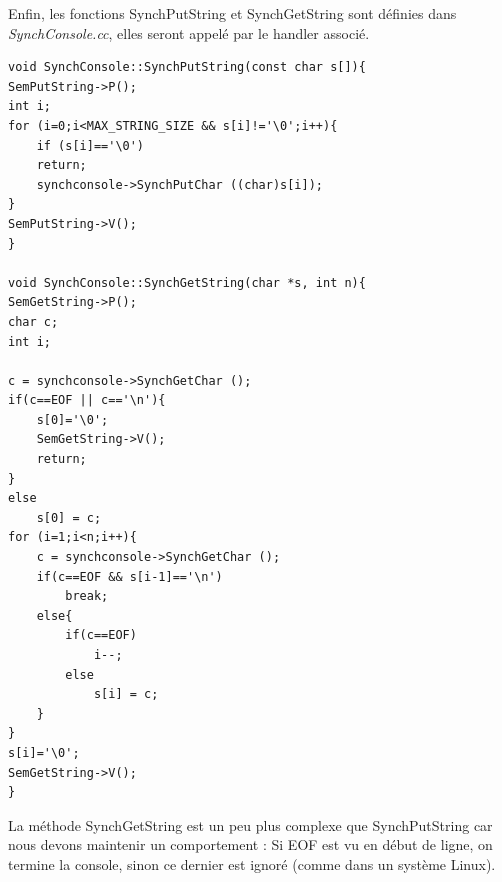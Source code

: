 \documentclass[a4paper,10pt]{article}
\begin{document}
Enfin, les fonctions SynchPutString et SynchGetString sont définies dans \textit{SynchConsole.cc}, elles seront appelé
par le handler associé.

\begin{lstlisting}[frame=single]
void SynchConsole::SynchPutString(const char s[]){
SemPutString->P();
int i;
for (i=0;i<MAX_STRING_SIZE && s[i]!='\0';i++){
	if (s[i]=='\0')
	return;
	synchconsole->SynchPutChar ((char)s[i]);
}
SemPutString->V();
}

void SynchConsole::SynchGetString(char *s, int n){
SemGetString->P();
char c;
int i;

c = synchconsole->SynchGetChar ();
if(c==EOF || c=='\n'){
	s[0]='\0';
	SemGetString->V();
	return;
}
else
	s[0] = c;
for (i=1;i<n;i++){
	c = synchconsole->SynchGetChar ();
	if(c==EOF && s[i-1]=='\n')
		break;
	else{
		if(c==EOF)
			i--;
		else
			s[i] = c;
	}
}
s[i]='\0';
SemGetString->V();
}
\end{lstlisting}
La méthode SynchGetString est un peu plus complexe que SynchPutString car nous devons maintenir un comportement :
Si EOF est vu en début de ligne, on termine la console, sinon ce dernier est ignoré (comme dans un système Linux).
\newpage
\end{document}
